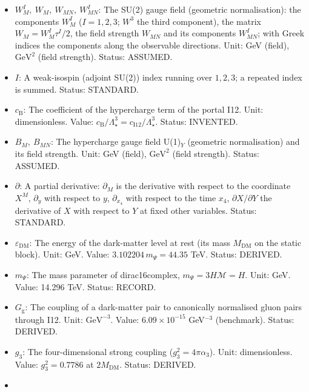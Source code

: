 \documentclass[
  10pt,
]{article}
\begin{document}
\begin{itemize}
  \(c_{\mathrm{W}}\): The coefficient of the SU(2) term of the portal
  I12. Unit: dimensionless. Value:
  \(c_{\mathrm{W}}/\Lambda_\star^3 = c_{\mathrm{I12}}/\Lambda_\star^3\).
  Status: INVENTED.
\item
  \(W^I_M,\ W_M,\ W_{MN},\ W^I_{MN}\): The SU(2) gauge field (geometric
  normalisation): the components \(W^I_M\) (\(I = 1, 2, 3\); \(W^3\) the
  third component), the matrix \(W_M = W^I_M\tau^I/2\), the field
  strength \(W_{MN}\) and its components \(W^I_{MN}\); with Greek
  indices the components along the observable directions. Unit: GeV
  (field), \(\mathrm{GeV}^{2}\) (field strength). Status: ASSUMED.
\item
  \(I\): A weak-isospin (adjoint SU(2)) index running over \(1, 2, 3\);
  a repeated index is summed. Status: STANDARD.
\item
  \(c_{\mathrm{B}}\): The coefficient of the hypercharge term of the
  portal I12. Unit: dimensionless. Value:
  \(c_{\mathrm{B}}/\Lambda_\star^3 = c_{\mathrm{I12}}/\Lambda_\star^3\).
  Status: INVENTED.
\item
  \(B_M,\ B_{MN}\): The hypercharge gauge field U(1)\(_Y\) (geometric
  normalisation) and its field strength. Unit: GeV (field),
  \(\mathrm{GeV}^{2}\) (field strength). Status: ASSUMED.
\item
  \(\partial\): A partial derivative: \(\partial_M\) is the derivative
  with respect to the coordinate \(X^M\), \(\partial_y\) with respect to
  \(y\), \(\partial_{x_4}\) with respect to the time \(x_4\),
  \(\partial X/\partial Y\) the derivative of \(X\) with respect to
  \(Y\) at fixed other variables. Status: STANDARD.
\item
  \(\varepsilon_{\mathrm{DM}}\): The energy of the dark-matter level at
  rest (its mass \(M_{\mathrm{DM}}\) on the static block). Unit: GeV.
  Value: \(3.102204\,m_\Psi = 44.35\) TeV. Status: DERIVED.
\item
  \(m_\Psi\): The mass parameter of dirac16complex,
  \(m_\Psi = 3H\mathcal{M} = H\). Unit: GeV. Value: 14.296 TeV. Status:
  RECORD.
\item
  \(G_{\mathrm{g}}\): The coupling of a dark-matter pair to canonically
  normalised gluon pairs through I12. Unit: \(\mathrm{GeV}^{-3}\).
  Value: \(6.09\times10^{-15}\) GeV\(^{-3}\) (benchmark). Status:
  DERIVED.
\item
  \(g_3\): The four-dimensional strong coupling
  (\(g_3^2 = 4\pi\alpha_3\)). Unit: dimensionless. Value:
  \(g_3^2 = 0.7786\) at \(2M_{\mathrm{DM}}\). Status: DERIVED.
\item

\end{itemize}
\end{document}
